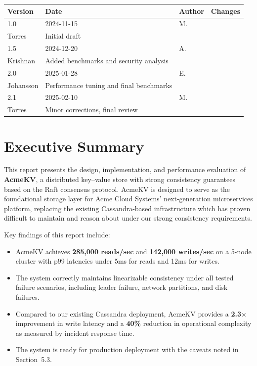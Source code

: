 \documentclass[12pt,a4paper]{report}
\begin{document}
\begin{table}[H]
\centering
\begin{tabular}{@{}llll@{}}
\toprule
\textbf{Version} & \textbf{Date} & \textbf{Author} & \textbf{Changes} \\
\midrule
1.0 & 2024-11-15 & M.\\ Torres & Initial draft \\
1.5 & 2024-12-20 & A.\\ Krishnan & Added benchmarks and security analysis \\
2.0 & 2025-01-28 & E.\\ Johansson & Performance tuning and final benchmarks \\
2.1 & 2025-02-10 & M.\\ Torres & Minor corrections, final review \\
\bottomrule
\end{tabular}
\end{table}

\chapter*{Executive Summary}

This report presents the design, implementation, and performance evaluation of \textbf{AcmeKV}, a distributed key--value store with strong consistency guarantees based on the Raft consensus protocol. AcmeKV is designed to serve as the foundational storage layer for Acme Cloud Systems' next-generation microservices platform, replacing the existing Cassandra-based infrastructure which has proven difficult to maintain and reason about under our strong consistency requirements.

Key findings of this report include:
\begin{itemize}[itemsep=4pt]
  \item AcmeKV achieves \textbf{285,000 reads/sec} and \textbf{142,000 writes/sec} on a 5-node cluster with p99 latencies under 5ms for reads and 12ms for writes.
  \item The system correctly maintains linearizable consistency under all tested failure scenarios, including leader failure, network partitions, and disk failures.
  \item Compared to our existing Cassandra deployment, AcmeKV provides a \textbf{2.3$\times$} improvement in write latency and a \textbf{40\%} reduction in operational complexity as measured by incident response time.
  \item The system is ready for production deployment with the caveats noted in Section~5.3.
\end{itemize}
\end{document}
